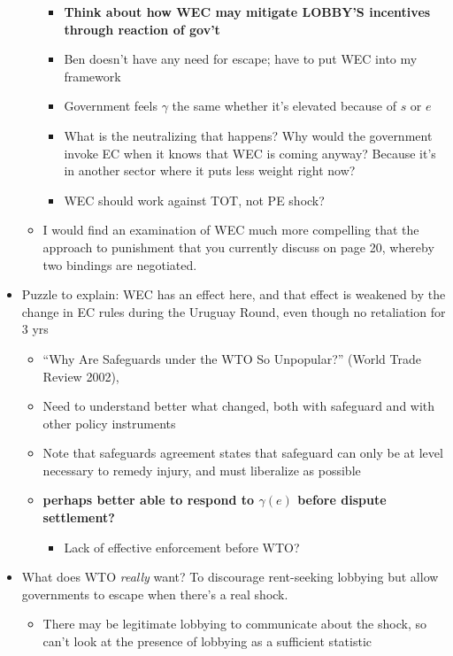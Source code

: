 \documentclass[12pt]{article}
\newcommand{\ga}{\gamma}
\begin{document}
\begin{itemize}
\begin{itemize}
						\begin{itemize}
							\item \textbf{Think about how WEC may mitigate LOBBY'S incentives through reaction of gov't}
							\item Ben doesn't have any need for escape; have to put WEC into my framework
							\item Government feels $\ga$ the same whether it's elevated because of $s$ or $e$
							\item What is the neutralizing that happens? Why would the government invoke EC when it knows that WEC is coming anyway? Because it's in another sector where it puts less weight right now?
							\item WEC should work against TOT, not PE shock?
						\end{itemize}
					\item I would find an examination of WEC much more compelling that the approach to punishment that you currently discuss on page 20, whereby two bindings are negotiated.
				\end{itemize}
			\item Puzzle to explain: WEC has an effect here, and that effect is weakened by the change in EC rules during the Uruguay Round, even though no retaliation for 3 yrs
				\begin{itemize}
					\item ``Why Are Safeguards under the WTO So Unpopular?'' (World Trade Review 2002), %
					\item Need to understand better what changed, both with safeguard and with other policy instruments
					\item Note that safeguards agreement states that safeguard can only be at level necessary to remedy injury, and must liberalize as possible
					\item \textbf{perhaps better able to respond to $\ga(e)$ before dispute settlement?}
						\begin{itemize}
							\item Lack of effective enforcement before WTO?
						\end{itemize}
				\end{itemize}
			\item What does WTO \textit{really} want? To discourage rent-seeking lobbying but allow governments to escape when there's a real shock.
				\begin{itemize}
					\item There may be legitimate lobbying to communicate about the shock, so can't look at the presence of lobbying as a sufficient statistic

\end{itemize}
\end{itemize}
\end{document}
